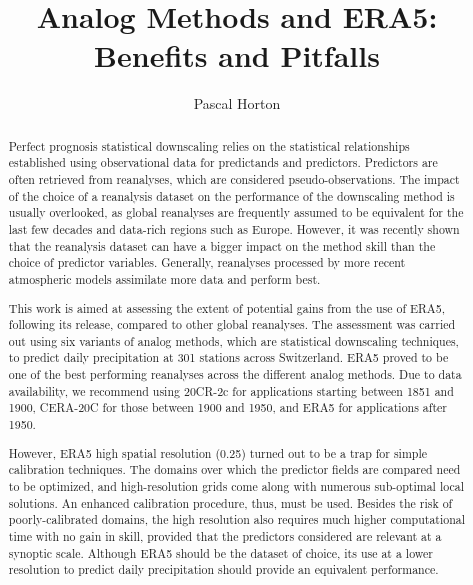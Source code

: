 \documentclass[alpha-refs]{wiley-article}
\title{Analog Methods and ERA5: Benefits and Pitfalls}
\author[1]{Pascal Horton}
\affil[1]{Oeschger Centre for Climate Change Research and Institute of Geography, University of Bern, Bern, Switzerland}
\begin{document}
\maketitle

\begin{abstract}
Perfect prognosis statistical downscaling relies on the statistical relationships established using observational data for predictands and predictors. Predictors are often retrieved from reanalyses, which are considered pseudo-observations. The impact of the choice of a reanalysis dataset on the performance of the downscaling method is usually overlooked, as global reanalyses are frequently assumed to be equivalent for the last few decades and data-rich regions such as Europe. However, it was recently shown that the reanalysis dataset can have a bigger impact on the method skill than the choice of predictor variables. Generally, reanalyses processed by more recent atmospheric models assimilate more data and perform best.

This work is aimed at assessing the extent of potential gains from the use of ERA5, following its release, compared to other global reanalyses. The assessment was carried out using six variants of analog methods, which are statistical downscaling techniques, to predict daily precipitation at 301 stations across Switzerland. ERA5 proved to be one of the best performing reanalyses across the different analog methods. Due to data availability, we recommend using 20CR-2c for applications starting between 1851 and 1900, CERA-20C for those between 1900 and 1950, and ERA5 for applications after 1950.

However, ERA5 high spatial resolution (0.25\degree) turned out to be a trap for simple calibration techniques. The domains over which the predictor fields are compared need to be optimized, and high-resolution grids come along with numerous sub-optimal local solutions. An enhanced calibration procedure, thus, must be used. Besides the risk of poorly-calibrated domains, the high resolution also requires much higher computational time with no gain in skill, provided that the predictors considered are relevant at a synoptic scale. Although ERA5 should be the dataset of choice, its use at a lower resolution to predict daily precipitation should provide an equivalent performance.



\end{abstract}
\end{document}

